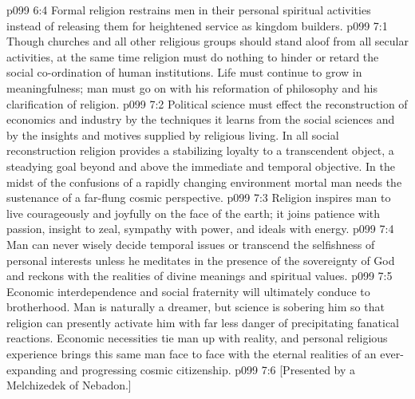 \vs p099 6:4 Formal religion restrains men in their personal spiritual activities instead of releasing them for heightened service as kingdom builders.
\vs p099 7:1 Though churches and all other religious groups should stand aloof from all secular activities, at the same time religion must do nothing to hinder or retard the social co\hyp{}ordination of human institutions. Life must continue to grow in meaningfulness; man must go on with his reformation of philosophy and his clarification of religion.\plusone
\vs p099 7:2 Political science must effect the reconstruction of economics and industry by the techniques it learns from the social sciences and by the insights and motives supplied by religious living. In all social reconstruction religion provides a stabilizing loyalty to a transcendent object, a steadying goal beyond and above the immediate and temporal objective. In the midst of the confusions of a rapidly changing environment mortal man needs the sustenance of a far\hyp{}flung cosmic perspective.
\vs p099 7:3 Religion inspires man to live courageously and joyfully on the face of the earth; it joins patience with passion, insight to zeal, sympathy with power, and ideals with energy.
\vs p099 7:4 Man can never wisely decide temporal issues or transcend the selfishness of personal interests unless he meditates in the presence of the sovereignty of God and reckons with the realities of divine meanings and spiritual values.
\vs p099 7:5 Economic interdependence and social fraternity will ultimately conduce to brotherhood. Man is naturally a dreamer, but science is sobering him so that religion can presently activate him with far less danger of precipitating fanatical reactions. Economic necessities tie man up with reality, and personal religious experience brings this same man face to face with the eternal realities of an ever\hyp{}expanding and progressing cosmic citizenship.
\vsetoff
\vs p099 7:6 [Presented by a Melchizedek of Nebadon.]
